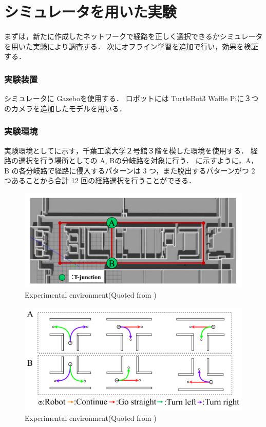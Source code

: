 \section{シミュレータを用いた実験}
まずは，新たに作成したネットワークで経路を正しく選択できるかシミュレータを用いた実験により調査する．
次にオフライン学習を追加で行い，効果を検証する．

\subsubsection{実験装置}
シミュレータに Gazebo\cite{gazebo}を使用する．
ロボットには TurtleBot3 Waffle Pi\cite{turtlebot3}に３つのカメラを追加したモデルを用いる．

\subsubsection{実験環境}
実験環境としてに示す，千葉工業大学２号館３階を模した環境を使用する．
経路の選択を行う場所としての A, Bの分岐路を対象に行う．
に示すように，A，B の各分岐路で経路に侵入するパターンは 3 つ，また脱出するパターンがつ 2 つあることから合計 12 回の経路選択を行うことができる．

\begin{figure}
  \centering
  \includegraphics[width=130mm]{images/pdf/haruyama/cit3f.pdf}
  \caption{Experimental environment(Quoted from \cite{haruyama2022})}
  \label{fig:haruyama_cit3f}
\end{figure}

\begin{figure}
  \centering
  \includegraphics[width=130mm]{images/pdf/haruyama/select_pattern.pdf}
  \caption{Experimental environment(Quoted from \cite{haruyama2022})}
  \label{fig:select_pattern}
\end{figure}
 
